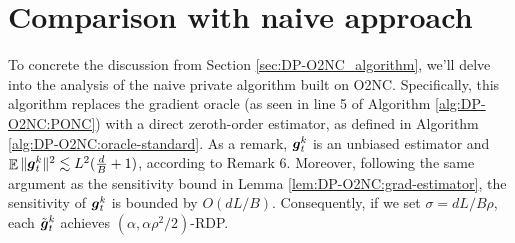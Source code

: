 \section{Comparison with naive approach}
\label{app:DP-O2NC:comparison}



To concrete the discussion from Section \ref{sec:DP-O2NC_algorithm}, we'll delve into the analysis of the naive private algorithm built on O2NC. Specifically, this algorithm replaces the gradient oracle (as seen in line 5 of Algorithm \ref{alg:DP-O2NC:PONC}) with a direct zeroth-order estimator, as defined in Algorithm \ref{alg:DP-O2NC:oracle-standard}. As a remark, ${\boldsymbol{g}}_t^k$ is an unbiased estimator and $\mathop{\mathbb{E}}\|{\boldsymbol{g}}_t^k\|^2 \lesssim L^2(\frac{d}{B}+1)$, according to \citep{kornowski2023algorithm} Remark 6. Moreover, following the same argument as the sensitivity bound in Lemma \ref{lem:DP-O2NC:grad-estimator}, the sensitivity of ${\boldsymbol{g}}_t^k$ is bounded by $O(dL/B)$. Consequently, if we set $\sigma=dL/B\rho$, each $\tilde{{\boldsymbol{g}}}_t^k$ achieves $(\alpha,\alpha\rho^2/2)$-RDP. 

